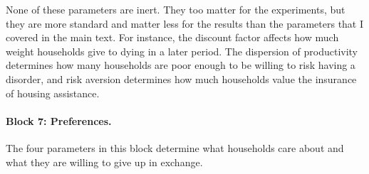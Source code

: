 \documentclass[10pt]{article}
\begin{document}
 None of these parameters are inert. They too matter for the experiments, but they are more standard and matter less for the results than the parameters that I covered in the main text. For instance, the discount factor affects how much weight households give to dying in a later period. The dispersion of productivity determines how many households are poor enough to be willing to risk having a disorder, and risk aversion determines how much households value the insurance of housing assistance.




\paragraph{Block 7: Preferences.}  The four parameters in this block determine what households care about and what they are willing to give up in exchange.
\end{document}
